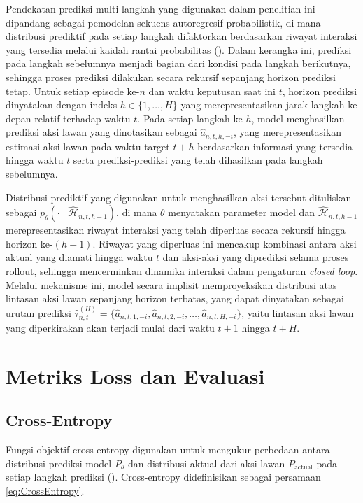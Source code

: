 Pendekatan prediksi multi-langkah yang digunakan dalam penelitian ini dipandang sebagai pemodelan sekuens autoregresif probabilistik, di mana distribusi prediktif pada setiap langkah difaktorkan berdasarkan riwayat interaksi yang tersedia melalui kaidah rantai probabilitas (\cite{goodfellow_2016_dl}). Dalam kerangka ini, prediksi pada langkah sebelumnya menjadi bagian dari kondisi pada langkah berikutnya, sehingga proses prediksi dilakukan secara rekursif sepanjang horizon prediksi tetap. Untuk setiap episode ke-$n$ dan waktu keputusan saat ini $t$, horizon prediksi dinyatakan dengan indeks $h \in \{1, \dots, H\}$ yang merepresentasikan jarak langkah ke depan relatif terhadap waktu $t$. Pada setiap langkah ke-$h$, model menghasilkan prediksi aksi lawan yang dinotasikan sebagai $\hat{a}_{n,t,h,-i}$, yang merepresentasikan estimasi aksi lawan pada waktu target $t+h$ berdasarkan informasi yang tersedia hingga waktu $t$ serta prediksi-prediksi yang telah dihasilkan pada langkah sebelumnya.

Distribusi prediktif yang digunakan untuk menghasilkan aksi tersebut dituliskan sebagai $p_{\theta}(\cdot \mid \hat{\mathcal{H}}_{n,t,h-1})$, di mana $\theta$ menyatakan parameter model dan $\hat{\mathcal{H}}_{n,t,h-1}$ merepresentasikan riwayat interaksi yang telah diperluas secara rekursif hingga horizon ke-$(h-1)$. Riwayat yang diperluas ini mencakup kombinasi antara aksi aktual yang diamati hingga waktu $t$ dan aksi-aksi yang diprediksi selama proses rollout, sehingga mencerminkan dinamika interaksi dalam pengaturan \textit{closed loop}. Melalui mekanisme ini, model secara implisit memproyeksikan distribusi atas lintasan aksi lawan sepanjang horizon terbatas, yang dapat dinyatakan sebagai urutan prediksi $\hat{\tau}_{n,t}^{(H)} = \{ \hat{a}_{n,t,1,-i}, \hat{a}_{n,t,2,-i}, \dots, \hat{a}_{n,t,H,-i} \}$, yaitu lintasan aksi lawan yang diperkirakan akan terjadi mulai dari waktu $t+1$ hingga $t+H$.

\section{Metriks Loss dan Evaluasi}

\subsection{Cross-Entropy}\label{sec:CrossEntropy}
Fungsi objektif cross-entropy digunakan untuk mengukur perbedaan antara distribusi prediksi model $P_\theta$ dan distribusi aktual dari aksi lawan $P_{\text{actual}}$ pada setiap langkah prediksi (\cite{rosasco_are_2004}). Cross-entropy didefinisikan sebagai persamaan \ref{eq:CrossEntropy}.

